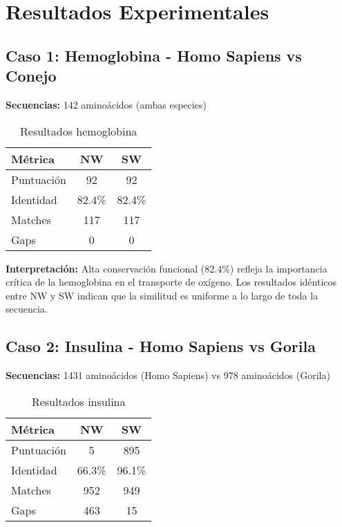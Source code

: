 \documentclass[12pt,a4paper]{article}
\begin{document}
\section{Resultados Experimentales}

\subsection{Caso 1: Hemoglobina - Homo Sapiens vs Conejo}

\textbf{Secuencias:} 142 aminoácidos (ambas especies)

\begin{table}[H]
\centering
\caption{Resultados hemoglobina}
\begin{tabular}{@{}lcc@{}}
\toprule
\textbf{Métrica} & \textbf{NW} & \textbf{SW} \\ \midrule
Puntuación & 92 & 92 \\
Identidad & 82.4\% & 82.4\% \\
Matches & 117 & 117 \\
Gaps & 0 & 0 \\ \bottomrule
\end{tabular}
\end{table}

\textbf{Interpretación:} Alta conservación funcional (82.4\%) refleja la importancia crítica de la hemoglobina en el transporte de oxígeno. Los resultados idénticos entre NW y SW indican que la similitud es uniforme a lo largo de toda la secuencia.

\subsection{Caso 2: Insulina - Homo Sapiens vs Gorila}

\textbf{Secuencias:} 1431 aminoácidos (Homo Sapiens) vs 978 aminoácidos (Gorila)

\begin{table}[H]
\centering
\caption{Resultados insulina}
\begin{tabular}{@{}lcc@{}}
\toprule
\textbf{Métrica} & \textbf{NW} & \textbf{SW} \\ \midrule
Puntuación & 5 & 895 \\
Identidad & 66.3\% & 96.1\% \\
Matches & 952 & 949 \\
Gaps & 463 & 15 \\ \bottomrule
\end{tabular}
\end{table}
\end{document}
